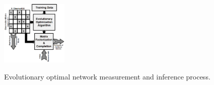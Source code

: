 \begin{figure}[t]
  \begin{center}
    {\includegraphics[keepaspectratio, width=0.28\textwidth]{EVSmpMC.png}} \\  %
  \end{center}
  \caption{{Evolutionary optimal network measurement and inference process.}}
  \label{fig:EVSmpMC}
\end{figure}

